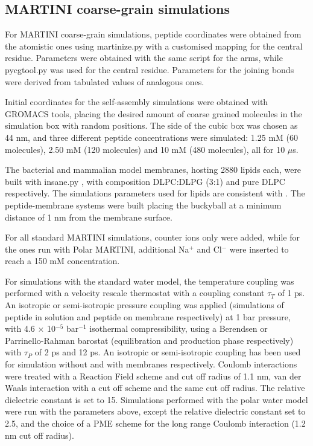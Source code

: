 \subsection{MARTINI coarse-grain simulations} \label{sec:MARTINI_sim_det}
For MARTINI \citep{Marrink2007, Monticelli2008} coarse-grain simulations, peptide coordinates were obtained from the atomistic ones using martinize.py \citep{DeJong2013} with a customised mapping for the central residue. Parameters were obtained with the same script for the arms, while pycgtool.py \citep{Graham2017} was used for the central residue. Parameters for the joining bonds were derived from tabulated values of analogous ones.

Initial coordinates for the self-assembly simulations were obtained with GROMACS tools, placing the desired amount of coarse grained molecules in the simulation box with random positions.
%
The side of the cubic box was chosen as 44 nm, and three different peptide concentrations were simulated: 1.25 mM (60 molecules), 2.50 mM (120 molecules) and 10 mM (480 molecules), all for 10 $\mu$s.

The bacterial and mammalian model membranes, hosting 2880 lipids each, were built with insane.py \citep{Wassenaar2015}, with composition DLPC:DLPG (3:1) and pure DLPC respectively. The simulations parameters used for lipids are consistent with \citet{SiewertJ.Marrink2003}. The peptide-membrane systems were built placing the buckyball at a minimum distance of 1 nm from the membrane surface.

For all standard MARTINI simulations, counter ions only were added, while for the ones run with Polar MARTINI, additional Na$^+$ and Cl$^-$ were inserted to reach a 150 mM concentration.

For simulations with the standard water model, the temperature coupling was performed with a velocity rescale thermostat \citep{Bussi2007} with a coupling constant $\tau _T$ of 1 ps. An isotropic or semi-isotropic pressure coupling was applied (simulations of peptide in solution and peptide on membrane respectively) at 1 bar pressure, with 4.6 $\times$ 10$^{-5}$ bar$^{-1}$ isothermal compressibility, using a Berendsen \citep{Berendsen1984} or Parrinello-Rahman barostat \citep{Parrinello1981} (equilibration and production phase respectively) with $\tau _P$ of 2 ps and 12 ps. An isotropic or semi-isotropic coupling has been used for simulation without and with membranes respectively.
%
Coulomb interactions were treated with a Reaction Field scheme \citep{Tironi1995} and cut off radius of 1.1 nm, van der Waals interaction with a cut off scheme and the same cut off radius. The relative dielectric constant is set to 15.
%
Simulations performed with the polar water model were run with the parameters above, except the relative dielectric constant set to 2.5, and the choice of a PME scheme for the long range Coulomb interaction (1.2 nm cut off radius).

